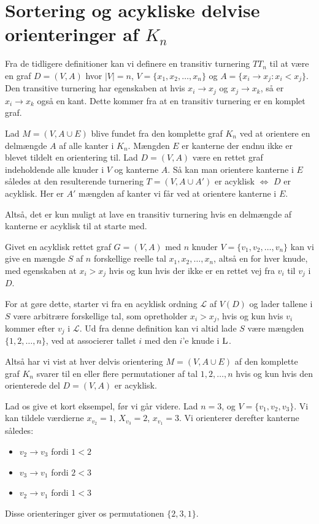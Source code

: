 \section{Sortering og acykliske delvise orienteringer af $K_{n}$}%
\label{sec:jbjnotes3}

Fra de tidligere definitioner kan vi definere en transitiv turnering $TT_{n}$ til at være en graf $D = (V,A)$ hvor $|V| = n$, $V  =\{x_{1}, x_{2}, \ldots, x_{n}\}$ og $A = \{x_{i} \rightarrow x_{j} : x_{i} < x_{j}\}$. Den transitive turnering har egenskaben at hvis $x_{i} \rightarrow x_{j}$ og $x_{j} \rightarrow x_{k}$, så er $x_{i} \rightarrow x_{k}$ også en kant. Dette kommer fra at en transitiv turnering er en komplet graf.

\begin{lemma}
	Lad $M = (V, A \cup E)$ blive fundet fra den komplette graf $K_{n}$ ved at orientere en delmængde $A$ af alle kanter i $K_{n}$. Mængden $E$ er kanterne der endnu ikke er blevet tildelt en orientering til. Lad $D = (V,A)$ være en rettet graf indeholdende alle knuder i $V$ og kanterne $A$. Så kan man orientere kanterne i $E$ således at den resulterende turnering $T = (V, A \cup A')$ er acyklisk $\iff$ $D$ er acyklisk. Her er $A'$ mængden af kanter vi får ved at orientere kanterne i $E$.
\end{lemma}

Altså, det er kun muligt at lave en transitiv turnering hvis en delmængde af kanterne er acyklisk til at starte med.

Givet en acyklisk rettet graf $G = (V,A)$ med $n$ knuder $V = \{v_{1}, v_{2}, \ldots, v_{n}\}$ kan vi give en mængde $S$ af $n$ forskellige reelle tal $x_{1}, x_{2}, \ldots, x_{n}$, altså en for hver knude, med egenskaben at $x_{i} > x_{j}$ hvis og kun hvis der ikke er en rettet vej fra $v_{i}$ til $v_{j}$ i $D$.

For at gøre dette, starter vi fra en acyklisk ordning $\mathcal{L}$ af $V(D)$ og lader tallene i $S$ være arbitrære forskellige tal, som opretholder $x_{i} > x_{j}$, hvis og kun hvis $v_{i}$ kommer efter $v_{j}$ i $\mathcal{L}$. Ud fra denne definition kan vi altid lade $S$ være mængden $\{1, 2, \ldots, n\}$, ved at associerer tallet $i$ med den $i$'e knude i $\textsc{L}$.

Altså har vi vist at hver delvis orientering $M = (V, A \cup E)$ af den komplette graf $K_{n}$ svarer til en eller flere permutationer af tal $1, 2, \ldots, n$ hvis og kun hvis den orienterede del $D = ( V,A )$ er acyklisk.

Lad os give et kort eksempel, før vi går videre. Lad $n = 3$, og $V = \{v_{1}, v_{2}, v_{3}\}$. Vi kan tildele værdierne $x_{v_{2}} = 1$, $X_{v_{3}} = 2$, $x_{v_{1}} = 3$. Vi orienterer derefter kanterne således:
\begin{itemize}
	\item $v_{2} \rightarrow v_{3}$ fordi $1 < 2$
	\item $v_{3} \rightarrow v_{1}$ fordi $2 < 3$
	\item $v_{2} \rightarrow v_{1}$ fordi $1 < 3$
\end{itemize}
Disse orienteringer giver os permutationen $\{2,3,1\}$.

